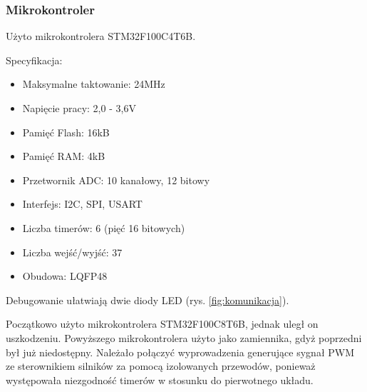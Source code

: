 \documentclass[12pt,a4paper]{article}
\begin{document}
\subsubsection{Mikrokontroler}
Użyto mikrokontrolera STM32F100C4T6B.

Specyfikacja: 
\begin{itemize}
\item Maksymalne taktowanie: 24MHz
\item Napięcie pracy: 2,0 - 3,6V
\item Pamięć Flash: 16kB
\item Pamięć RAM: 4kB
\item Przetwornik ADC: 10 kanałowy, 12 bitowy
\item Interfejs: I2C, SPI, USART
\item Liczba timerów: 6 (pięć 16 bitowych)
\item Liczba wejść/wyjść: 37
\item Obudowa: LQFP48
\end{itemize}

Debugowanie ułatwiają dwie diody LED (rys. \ref{fig:komunikacja}).

Początkowo użyto mikrokontrolera STM32F100C8T6B, jednak uległ on uszkodzeniu. Powyższego mikrokontrolera użyto jako zamiennika, gdyż poprzedni był już niedostępny. Należało połączyć wyprowadzenia generujące sygnał PWM ze sterownikiem silników za pomocą izolowanych przewodów, ponieważ występowała niezgodność timerów w stosunku do pierwotnego układu.
\end{document}
